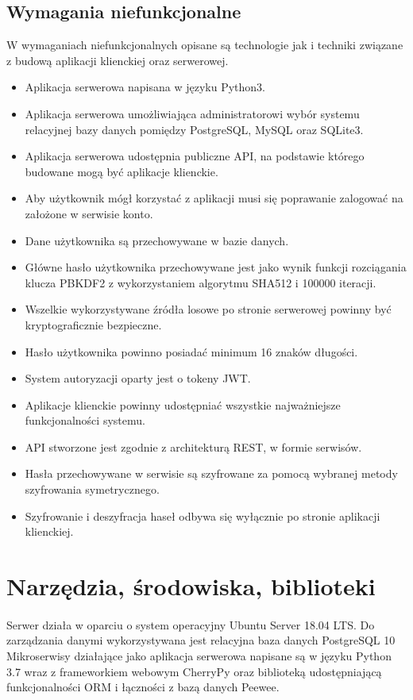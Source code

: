 \documentclass{article}
\begin{document}
    \subsection{Wymagania niefunkcjonalne}
    W wymaganiach niefunkcjonalnych opisane są technologie jak i techniki związane z budową aplikacji klienckiej oraz serwerowej.
	\begin{itemize}
		\item Aplikacja serwerowa napisana w języku Python3.
		\item Aplikacja serwerowa umożliwiająca administratorowi wybór systemu relacyjnej bazy danych pomiędzy PostgreSQL, MySQL oraz SQLite3.
		\item Aplikacja serwerowa udostępnia publiczne API, na podstawie którego budowane mogą być aplikacje klienckie.
		\item Aby użytkownik mógł korzystać z aplikacji musi się poprawanie zalogować na założone w serwisie konto.
		\item Dane użytkownika są przechowywane w bazie danych.
		\item Główne hasło użytkownika przechowywane jest jako wynik funkcji rozciągania klucza PBKDF2 z wykorzystaniem algorytmu SHA512 i 100000 iteracji.
		\item Wszelkie wykorzystywane źródła losowe po stronie serwerowej powinny być kryptograficznie bezpieczne.
		\item Hasło użytkownika powinno posiadać minimum 16 znaków długości.
		\item System autoryzacji oparty jest o tokeny JWT.
		\item Aplikacje klienckie powinny udostępniać wszystkie najważniejsze funkcjonalności systemu.
		\item API stworzone jest zgodnie z architekturą REST, w formie serwisów.
		\item Hasła przechowywane w serwisie są szyfrowane za pomocą wybranej metody szyfrowania symetrycznego.
		\item Szyfrowanie i deszyfracja haseł odbywa się wyłącznie po stronie aplikacji klienckiej.
	\end{itemize}

    \section{Narzędzia, środowiska, biblioteki}
    \paragraph{}Serwer działa w oparciu o system operacyjny Ubuntu Server 18.04 LTS.
	Do zarządzania danymi wykorzystywana jest relacyjna baza danych PostgreSQL 10
	Mikroserwisy działające jako aplikacja serwerowa napisane są w języku Python 3.7 wraz z frameworkiem webowym CherryPy oraz biblioteką udostępniającą funkcjonalności ORM i łączności z bazą danych Peewee.
\end{document}
